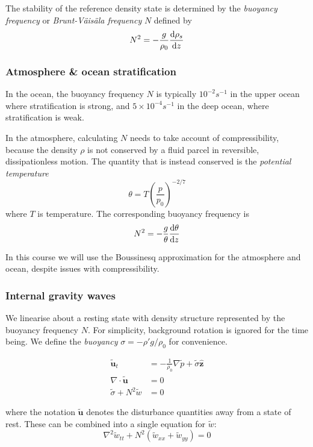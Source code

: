 \documentclass{jknotes}
\begin{document}
The stability of the reference density state is determined by the
\emph{buoyancy frequency} or \emph{Brunt-V\"{a}is\"{a}la frequency} $N$
defined by
\begin{equation}
	N^2 = -\frac{g}{\rho_0} \frac{\diffd \rho_s}{\diffd z}
\end{equation}

\subsubsection{Atmosphere \& ocean stratification}
In the ocean, the buoyancy frequency $N$ is typically $10^{-2} s^{-1}$ in the
upper ocean where stratification is strong, and $5 \times 10^{-4} s^{-1}$ in
the deep ocean, where stratification is weak.

In the atmosphere, calculating $N$ needs to take account of compressibility,
because the density $\rho$ is not conserved by a fluid parcel in reversible,
dissipationless motion. The quantity that is instead conserved is the
\emph{potential temperature}
\begin{equation}
	\theta = T \left(\frac{p}{p_0}\right)^{-2/7}
\end{equation}
where $T$ is temperature. The corresponding buoyancy frequency is
\begin{equation}
	N^2 = -\frac{g}{\theta} \frac{\diffd \theta}{\diffd z}
\end{equation}

In this course we will use the Boussinesq approximation for the atmosphere and
ocean, despite issues with compressibility.

\subsubsection{Internal gravity waves}
We linearise about a resting state with density structure represented by the
buoyancy frequency $N$. For simplicity, background rotation is ignored for the
time being. We define the \emph{buoyancy} $\sigma = -\rho' g/\rho_0$ for
convenience.

\begin{align}
	\tilde{\symbf{u}}_t &= -\frac{1}{\rho_0} \nabla \tilde{p} + \tilde{\sigma}
	\hat{\symbf{z}} \\
	\nabla \cdot \tilde{\symbf{u}} &= 0 \\
	\tilde{\sigma} + N^2 \tilde{w} &= 0
\end{align}

where the notation $\tilde{\symbf{u}}$ denotes the disturbance quantities away from a
state of rest. These can be combined into a single equation for $\tilde{w}$:
\begin{equation}
	\nabla^2 \tilde{w}_{tt} + N^2(\tilde{w}_{xx} + \tilde{w}_{yy}) = 0
\end{equation}
\end{document}
